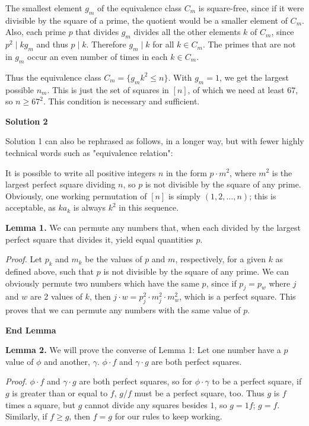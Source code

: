 \begin{enumerate}
 The smallest element $g_m$ of the equivalence class $C_m$ is square-free, since if it were divisible by the square of a prime, the quotient would be a smaller element of $C_m$. Also, each prime $p$ that divides $g_m$ divides all the other elements $k$ of $C_m$, since $p^2\mid kg_m$ and thus $p\mid k$. Therefore $g_m\mid k$ for all $k\in C_m$. The primes that are not in $g_m$ occur an even number of times in each $k\in C_m$.

 Thus the equivalence class $C_m = \{g_mk^2\leq n\}$. With $g_m = 1$, we get the largest possible $n_m$. This is just the set of squares in $[n]$, of which we need at least $67$, so $n\geq 67^2$. This condition is necessary and sufficient.

 



\textbf{Solution 2}

Solution 1 can also be rephrased as follows, in a longer way, but with fewer highly technical words such as "equivalence relation":

 It is possible to write all positive integers $n$ in the form $p\cdot m^2$, where $m^2$ is the largest perfect square dividing $n$, so $p$ is not divisible by the square of any prime. Obviously, one working permutation of $[n]$ is simply $(1, 2, \ldots, n)$; this is acceptable, as $ka_k$ is always $k^2$ in this sequence.

 \textbf{Lemma 1.} We can permute any numbers that, when each divided by the largest perfect square that divides it, yield equal quantities $p$.

 \textit{Proof.} Let $p_k$ and $m_k$ be the values of $p$ and $m$, respectively, for a given $k$ as defined above, such that $p$ is not divisible by the square of any prime. We can obviously permute two numbers which have the same $p$, since if $p_j = p_w$ where $j$ and $w$ are 2 values of $k$, then $j\cdot w = p_j^2\cdot m_j^2\cdot m_w^2$, which is a perfect square. This proves that we can permute any numbers with the same value of $p$.

 \textbf{End Lemma}

 \textbf{Lemma 2.} We will prove the converse of Lemma 1: Let one number have a $p$ value of $\phi$ and another, $\gamma$. $\phi\cdot f$ and $\gamma\cdot g$ are both perfect squares.

 \textit{Proof.} $\phi\cdot f$ and $\gamma\cdot g$ are both perfect squares, so for $\phi\cdot \gamma$ to be a perfect square, if $g$ is greater than or equal to $f$, $g/f$ must be a perfect square, too. Thus $g$ is $f$ times a square, but $g$ cannot divide any squares besides $1$, so $g = 1f$; $g = f$. Similarly, if $f\geq g$, then $f = g$ for our rules to keep working.


\end{enumerate}
